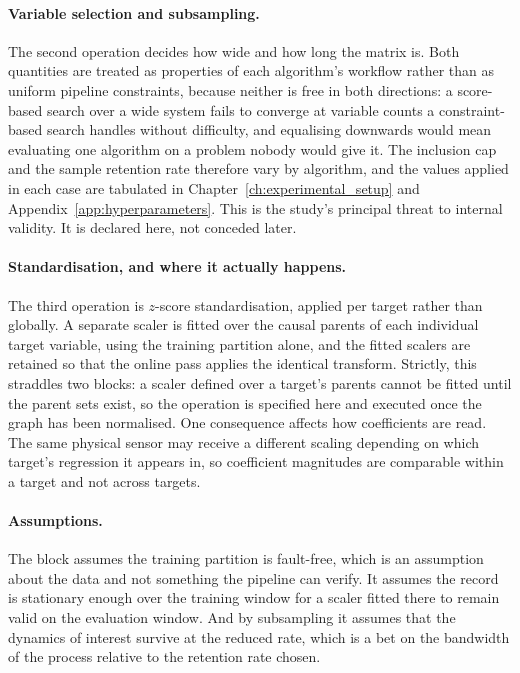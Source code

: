 \paragraph{Variable selection and subsampling.} The second operation decides how wide and how long the matrix is. Both quantities are treated as properties of each algorithm's workflow rather than as uniform pipeline constraints, because neither is free in both directions: a score-based search over a wide system fails to converge at variable counts a constraint-based search handles without difficulty, and equalising downwards would mean evaluating one algorithm on a problem nobody would give it. The inclusion cap and the sample retention rate therefore vary by algorithm, and the values applied in each case are tabulated in Chapter~\ref{ch:experimental_setup} and Appendix~\ref{app:hyperparameters}. This is the study's principal threat to internal validity. It is declared here, not conceded later.

\paragraph{Standardisation, and where it actually happens.} The third operation is $z$-score standardisation, applied per target rather than globally. A separate scaler is fitted over the causal parents of each individual target variable, using the training partition alone, and the fitted scalers are retained so that the online pass applies the identical transform. Strictly, this straddles two blocks: a scaler defined over a target's parents cannot be fitted until the parent sets exist, so the operation is specified here and executed once the graph has been normalised. One consequence affects how coefficients are read. The same physical sensor may receive a different scaling depending on which target's regression it appears in, so coefficient magnitudes are comparable within a target and not across targets.

\paragraph{Assumptions.} The block assumes the training partition is fault-free, which is an assumption about the data and not something the pipeline can verify. It assumes the record is stationary enough over the training window for a scaler fitted there to remain valid on the evaluation window. And by subsampling it assumes that the dynamics of interest survive at the reduced rate, which is a bet on the bandwidth of the process relative to the retention rate chosen.

